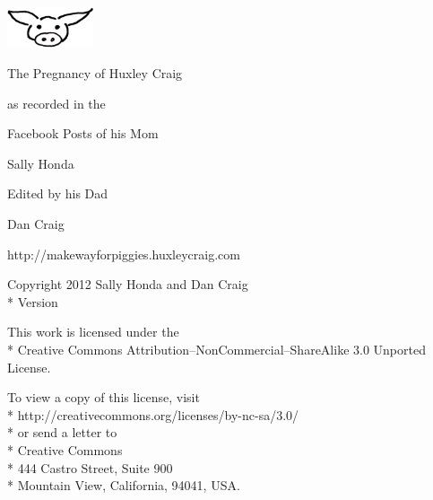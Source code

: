 \documentclass[11pt,ebook]{memoir}
\begin{document}
\frontmatter

\thispagestyle{empty}
\vspace*{1in}
\begin{center}
\end{center}

\cleardoublepage
\thispagestyle{empty}
\vspace*{\fill}
\begin{center}
\par
\vspace{0.15in}
\includegraphics[width=1in]{static_files/wiggins-150x71.png}\par
\vspace{0.15in}
\LARGE{The Pregnancy of Huxley Craig}\par
\vspace{0.1in}
\large{as recorded in the}\par
\large{Facebook Posts of his Mom}\par
\LARGE{Sally Honda}\par
\vspace{1in}
\large{Edited by his Dad}\par
\LARGE{Dan Craig}\par
\vspace{0.2in}
\large{http://makewayforpiggies.huxleycraig.com}
\end{center}
\clearpage

\begingroup
\vspace*{\fill}
\footnotesize
\setlength{\parindent}{0pt}
\setlength{\parskip}{\baselineskip}
\textcopyright{} Copyright 2012 Sally Honda and Dan Craig\\*
Version %

This work is licensed under the\\*
Creative Commons Attribution--NonCommercial--ShareAlike 3.0 Unported License.

To view a copy of this license, visit \\*
http://creativecommons.org/licenses/by-nc-sa/3.0/\\*
or send a letter to \\*
Creative Commons\\*
444 Castro Street, Suite 900\\*
Mountain View, California, 94041, USA.
\vspace*{\fill}
\endgroup
\clearpage
\end{document}
